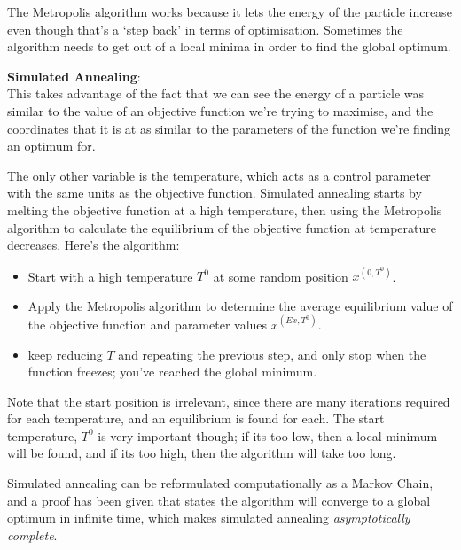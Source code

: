\begin{description}
\begin{description}
      The Metropolis algorithm works because it lets the energy of the particle
      increase even though that's a `step back' in terms of optimisation.
      Sometimes the algorithm needs to get out of a local minima in order to
      find the global optimum.
    \item \textbf{Simulated Annealing}:\\
      This takes advantage of the fact that we can see the energy of a particle
      was similar to the value of an objective function we're trying to
      maximise, and the coordinates that it is at as similar to the parameters
      of the function we're finding an optimum for.

      The only other variable is the temperature, which acts as a control
      parameter with the same units as the objective function. Simulated
      annealing starts by melting the objective function at a high temperature,
      then using the Metropolis algorithm to calculate the equilibrium of the
      objective function at temperature decreases. Here's the algorithm:

      \begin{itemize}
        \item Start with a high temperature $T^0$ at some random position
        $x^{(0, T^0)}$.
        \item Apply the Metropolis algorithm to determine the average 
        equilibrium value of the objective function and parameter values
        $x^{(Ex, T^0)}$.
        \item keep reducing $T$ and repeating the previous step, and only stop
        when the function freezes; you've reached the global minimum.
      \end{itemize}

      Note that the start position is irrelevant, since there are many
      iterations required for each temperature, and an equilibrium is found for
      each. The start temperature, $T^0$ is very important though; if its too
      low, then a local minimum will be found, and if its too high, then the
      algorithm will take too long.


      Simulated annealing can be reformulated computationally as a Markov Chain,
      and a proof has been given that states the algorithm will converge to a
      global optimum in infinite time, which makes simulated annealing
      \textit{asymptotically complete}.


\end{description}
\end{description}
